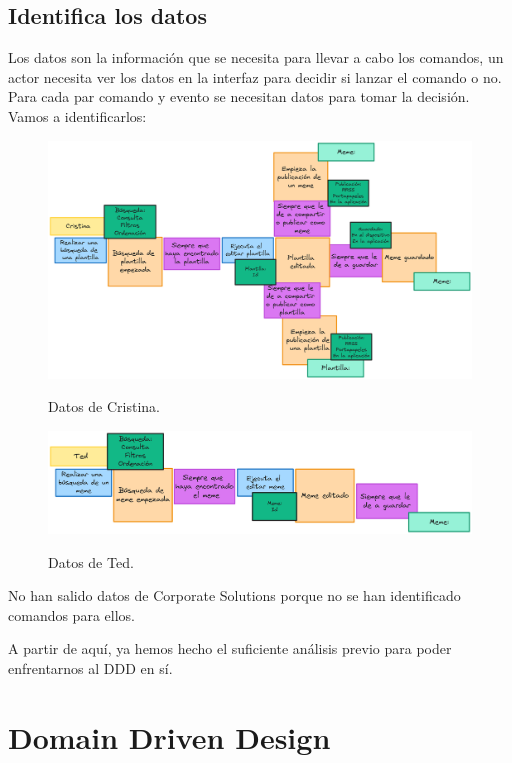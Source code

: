 \subsection{Identifica los datos}

Los datos son la información que se necesita para llevar a cabo los comandos, un actor necesita ver los datos en la interfaz para decidir si lanzar el comando o no. Para cada par comando y evento se necesitan datos para tomar la decisión. Vamos a identificarlos:

\begin{figure}[H]
    \caption{Datos de Cristina.}
    \centering
    \vspace*{0.5cm}
    \includegraphics[scale=0.15]{figuras/cristinadatos.png}\label{fig:figuras/cristinadatos.png}
\end{figure}

\begin{figure}[H]
    \caption{Datos de Ted.}
    \centering
    \vspace*{0.5cm}
    \includegraphics[scale=0.2]{figuras/teddatos.png}\label{fig:figuras/teddatos.png}
\end{figure}

No han salido datos de Corporate Solutions porque no se han identificado comandos para ellos.

A partir de aquí, ya hemos hecho el suficiente análisis previo para poder enfrentarnos al DDD en sí.

\section{Domain Driven Design}

